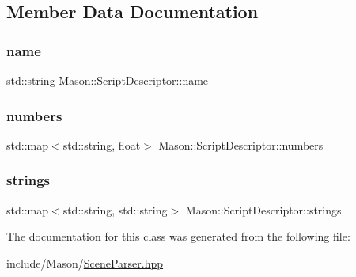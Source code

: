 \subsection{Member Data Documentation}
\hypertarget{class_mason_1_1_script_descriptor_aa04b0220bbef995dce7e14a778449460}{}\label{class_mason_1_1_script_descriptor_aa04b0220bbef995dce7e14a778449460} 
\subsubsection{\texorpdfstring{name}{name}}
{\footnotesize\ttfamily std\+::string Mason\+::\+Script\+Descriptor\+::name}

\hypertarget{class_mason_1_1_script_descriptor_a536144088cd6770fb4f63fe502d89e3e}{}\label{class_mason_1_1_script_descriptor_a536144088cd6770fb4f63fe502d89e3e} 
\subsubsection{\texorpdfstring{numbers}{numbers}}
{\footnotesize\ttfamily std\+::map$<$std\+::string, float$>$ Mason\+::\+Script\+Descriptor\+::numbers}

\hypertarget{class_mason_1_1_script_descriptor_a426d001b44ece88ba6b465b0505724c4}{}\label{class_mason_1_1_script_descriptor_a426d001b44ece88ba6b465b0505724c4} 
\subsubsection{\texorpdfstring{strings}{strings}}
{\footnotesize\ttfamily std\+::map$<$std\+::string, std\+::string$>$ Mason\+::\+Script\+Descriptor\+::strings}



The documentation for this class was generated from the following file\+:\begin{DoxyCompactItemize}
\item 
include/\+Mason/\hyperlink{_scene_parser_8hpp}{Scene\+Parser.\+hpp}\end{DoxyCompactItemize}
